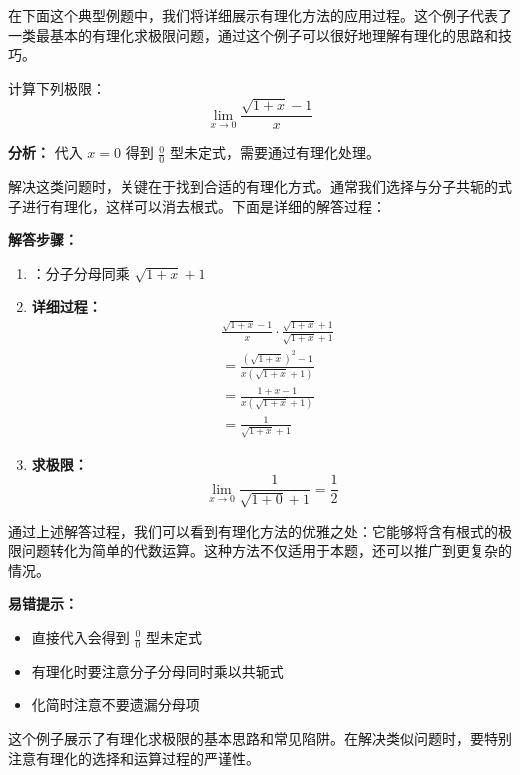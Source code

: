 \documentclass{ctexart}
\begin{document}
\newproblem
在下面这个典型例题中，我们将详细展示有理化方法的应用过程。这个例子代表了一类最基本的有理化求极限问题，通过这个例子可以很好地理解有理化的思路和技巧。

\begin{problem}[有理化求极限]
计算下列极限：
\[ \lim_{x \to 0} \frac{\sqrt{1+x}-1}{x} \]

\textbf{分析：} 代入 $x=0$ 得到 $\frac{0}{0}$ 型未定式，需要通过有理化处理。
\end{problem}

\begin{solution}
解决这类问题时，关键在于找到合适的有理化方式。通常我们选择与分子共轭的式子进行有理化，这样可以消去根式。下面是详细的解答过程：

\textbf{解答步骤：}
\begin{enumerate}
    \item {}：分子分母同乘 $\sqrt{1+x}+1$
    
    \item \textbf{详细过程：}
    \[ \begin{aligned}
    & \frac{\sqrt{1+x}-1}{x} \cdot \frac{\sqrt{1+x}+1}{\sqrt{1+x}+1} \\[5pt]
    & = \frac{(\sqrt{1+x})^2-1}{x(\sqrt{1+x}+1)} \\[5pt]
    & = \frac{1+x-1}{x(\sqrt{1+x}+1)} \\[5pt]
    & = \frac{1}{\sqrt{1+x}+1}
    \end{aligned} \]
    
    \item \textbf{求极限：}
    \[ \lim_{x \to 0} \frac{1}{\sqrt{1+0}+1} = \frac{1}{2} \]
\end{enumerate}

通过上述解答过程，我们可以看到有理化方法的优雅之处：它能够将含有根式的极限问题转化为简单的代数运算。这种方法不仅适用于本题，还可以推广到更复杂的情况。

\textbf{易错提示：}
\begin{itemize}
    \item 直接代入会得到 $\frac{0}{0}$ 型未定式
    \item 有理化时要注意分子分母同时乘以共轭式
    \item 化简时注意不要遗漏分母项
\end{itemize}

这个例子展示了有理化求极限的基本思路和常见陷阱。在解决类似问题时，要特别注意有理化的选择和运算过程的严谨性。
\end{solution}
\end{document}
